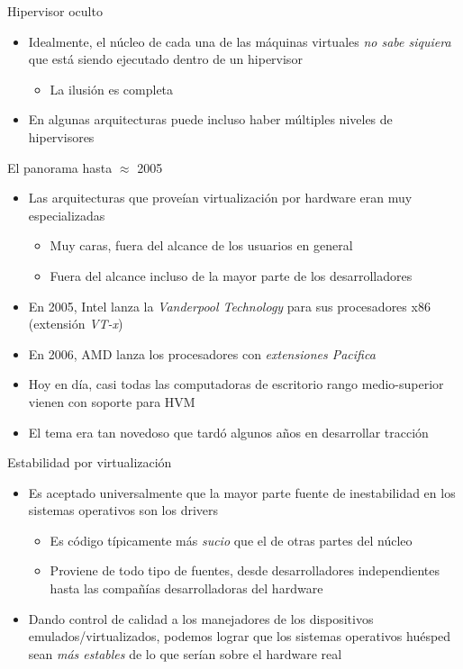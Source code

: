 \documentclass[presentation]{beamer}
\begin{document}
\begin{frame}[label={sec:org4666dcc}]{Hipervisor oculto}
\begin{itemize}
\item Idealmente, el núcleo de cada una de las máquinas virtuales \emph{no sabe
siquiera} que está siendo ejecutado dentro de un hipervisor
\begin{itemize}
\item La ilusión es completa
\end{itemize}
\item En algunas arquitecturas puede incluso haber múltiples niveles de
hipervisores
\end{itemize}
\end{frame}

\begin{frame}[label={sec:orgeef2f4a}]{El panorama hasta \(\approx\) 2005}
\begin{itemize}
\item Las arquitecturas que proveían virtualización por hardware eran muy
especializadas
\begin{itemize}
\item Muy caras, fuera del alcance de los usuarios en general
\item Fuera del alcance incluso de la mayor parte de los desarrolladores
\end{itemize}
\item En 2005, Intel lanza la \emph{Vanderpool Technology} para sus
procesadores x86 (extensión \emph{VT-x})
\item En 2006, AMD lanza los procesadores con \emph{extensiones Pacifica}
\item Hoy en día, casi todas las computadoras de escritorio rango
medio-superior vienen con soporte para HVM
\item El tema era tan novedoso que tardó algunos años en desarrollar
tracción
\end{itemize}
\end{frame}

\begin{frame}[label={sec:orgca1eef3}]{Estabilidad por virtualización}
\begin{itemize}
\item Es aceptado universalmente que la mayor parte fuente de
inestabilidad en los sistemas operativos son los drivers
\begin{itemize}
\item Es código típicamente más \emph{sucio} que el de otras partes del
núcleo
\item Proviene de todo tipo de fuentes, desde desarrolladores
independientes hasta las compañías desarrolladoras del hardware
\end{itemize}
\item Dando control de calidad a los manejadores de los dispositivos
emulados/virtualizados, podemos lograr que los sistemas operativos
huésped sean \emph{más estables} de lo que serían sobre el hardware real
\end{itemize}
\end{frame}
\end{document}
